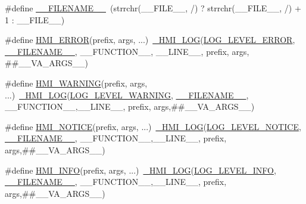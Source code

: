 \begin{DoxyCompactItemize}
\item 
\#define \hyperlink{include_2hmi-debug_8h_a5fccb4fc71e44089a1b1a77fc76c0b68}{\+\_\+\+\_\+\+F\+I\+L\+E\+N\+A\+M\+E\+\_\+\+\_\+}~(strrchr(\+\_\+\+\_\+\+F\+I\+L\+E\+\_\+\+\_\+, \textquotesingle{}/\textquotesingle{}) ? strrchr(\+\_\+\+\_\+\+F\+I\+L\+E\+\_\+\+\_\+, \textquotesingle{}/\textquotesingle{}) + 1 \+: \+\_\+\+\_\+\+F\+I\+L\+E\+\_\+\+\_\+)
\item 
\#define \hyperlink{include_2hmi-debug_8h_a65bb6c7cfe38f8a724beab5059d36fb2}{H\+M\+I\+\_\+\+E\+R\+R\+OR}(prefix,  args, ...)~\hyperlink{src_2hmi-debug_8h_a0846b9d51e2e0612c4825a9a581aa40a}{\+\_\+\+H\+M\+I\+\_\+\+L\+OG}(\hyperlink{src_2hmi-debug_8h_aa5a9053636a30269210c54e734e0d583a5b40f003febbc3b535649d63f4b8a44f}{L\+O\+G\+\_\+\+L\+E\+V\+E\+L\+\_\+\+E\+R\+R\+OR}, \hyperlink{src_2hmi-debug_8h_a5fccb4fc71e44089a1b1a77fc76c0b68}{\+\_\+\+\_\+\+F\+I\+L\+E\+N\+A\+M\+E\+\_\+\+\_\+}, \+\_\+\+\_\+\+F\+U\+N\+C\+T\+I\+O\+N\+\_\+\+\_\+, \+\_\+\+\_\+\+L\+I\+N\+E\+\_\+\+\_\+, prefix, args, \#\#\+\_\+\+\_\+\+V\+A\+\_\+\+A\+R\+G\+S\+\_\+\+\_\+)
\item 
\#define \hyperlink{include_2hmi-debug_8h_a25361812432cd2480bc8f1a8e56ecbf7}{H\+M\+I\+\_\+\+W\+A\+R\+N\+I\+NG}(prefix,  args, ...)~\hyperlink{src_2hmi-debug_8h_a0846b9d51e2e0612c4825a9a581aa40a}{\+\_\+\+H\+M\+I\+\_\+\+L\+OG}(\hyperlink{src_2hmi-debug_8h_aa5a9053636a30269210c54e734e0d583a5b4dd81b4dc7eefbc55ba03415c627ef}{L\+O\+G\+\_\+\+L\+E\+V\+E\+L\+\_\+\+W\+A\+R\+N\+I\+NG}, \hyperlink{src_2hmi-debug_8h_a5fccb4fc71e44089a1b1a77fc76c0b68}{\+\_\+\+\_\+\+F\+I\+L\+E\+N\+A\+M\+E\+\_\+\+\_\+}, \+\_\+\+\_\+\+F\+U\+N\+C\+T\+I\+O\+N\+\_\+\+\_\+,\+\_\+\+\_\+\+L\+I\+N\+E\+\_\+\+\_\+, prefix, args,\#\#\+\_\+\+\_\+\+V\+A\+\_\+\+A\+R\+G\+S\+\_\+\+\_\+)
\item 
\#define \hyperlink{include_2hmi-debug_8h_abc0d6e0760017d8ae48b836925b2ef15}{H\+M\+I\+\_\+\+N\+O\+T\+I\+CE}(prefix,  args, ...)~\hyperlink{src_2hmi-debug_8h_a0846b9d51e2e0612c4825a9a581aa40a}{\+\_\+\+H\+M\+I\+\_\+\+L\+OG}(\hyperlink{src_2hmi-debug_8h_aa5a9053636a30269210c54e734e0d583a23ae4d711a7bbb3900240cb7316b4b4e}{L\+O\+G\+\_\+\+L\+E\+V\+E\+L\+\_\+\+N\+O\+T\+I\+CE}, \hyperlink{src_2hmi-debug_8h_a5fccb4fc71e44089a1b1a77fc76c0b68}{\+\_\+\+\_\+\+F\+I\+L\+E\+N\+A\+M\+E\+\_\+\+\_\+}, \+\_\+\+\_\+\+F\+U\+N\+C\+T\+I\+O\+N\+\_\+\+\_\+,\+\_\+\+\_\+\+L\+I\+N\+E\+\_\+\+\_\+, prefix, args,\#\#\+\_\+\+\_\+\+V\+A\+\_\+\+A\+R\+G\+S\+\_\+\+\_\+)
\item 
\#define \hyperlink{include_2hmi-debug_8h_a11b249a67108f0f4c50a0fc8a3eb4f5c}{H\+M\+I\+\_\+\+I\+N\+FO}(prefix,  args, ...)~\hyperlink{src_2hmi-debug_8h_a0846b9d51e2e0612c4825a9a581aa40a}{\+\_\+\+H\+M\+I\+\_\+\+L\+OG}(\hyperlink{src_2hmi-debug_8h_aa5a9053636a30269210c54e734e0d583aedee1e3159bfe7d918b6e29873c5aee4}{L\+O\+G\+\_\+\+L\+E\+V\+E\+L\+\_\+\+I\+N\+FO}, \hyperlink{src_2hmi-debug_8h_a5fccb4fc71e44089a1b1a77fc76c0b68}{\+\_\+\+\_\+\+F\+I\+L\+E\+N\+A\+M\+E\+\_\+\+\_\+}, \+\_\+\+\_\+\+F\+U\+N\+C\+T\+I\+O\+N\+\_\+\+\_\+,\+\_\+\+\_\+\+L\+I\+N\+E\+\_\+\+\_\+, prefix, args,\#\#\+\_\+\+\_\+\+V\+A\+\_\+\+A\+R\+G\+S\+\_\+\+\_\+)

\end{DoxyCompactItemize}
